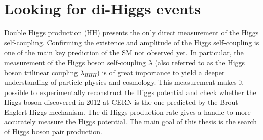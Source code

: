 \section{Looking for di-Higgs events}
\label{chap1:HH}
Double Higgs production (HH) presents the only direct measurement of the Higgs self-coupling. Confirming the existence and amplitude of the Higgs self-coupling is one of the main key prediction of the SM not observed yet. In particular, the measurement of the Higgs boson self-coupling $\lambda$ (also referred to as the Higgs boson trilinear coupling $\lambda_{HHH}$) is of great importance to yield a deeper understanding of particle physics and cosmology. This measurement makes it possible to experimentally reconstruct the Higgs potential and check whether the Higgs boson discovered in 2012 at CERN is the one predicted by the Brout-Englert-Higgs mechanism. The di-Higgs production rate gives a handle to more accurately measure the Higgs potential. The main goal of this thesis is the search of Higgs boson pair production.

